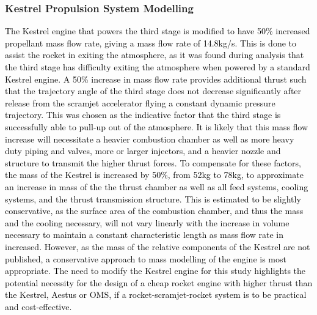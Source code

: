 		\subsubsection{Kestrel Propulsion System Modelling}
			\textcolor{black}{
		The Kestrel engine that powers the third stage is modified to have 50\% increased propellant mass flow rate, giving a mass flow rate of 14.8kg/s. This is done to assist the rocket in exiting the atmosphere, as it was found during analysis that the third stage has difficulty exiting the atmosphere when powered by a standard Kestrel engine. A 50\% increase in mass flow rate provides additional thrust such that the trajectory angle of the third stage does not decrease significantly after release from the scramjet accelerator flying a constant dynamic pressure trajectory. This was chosen as the indicative factor that the third stage is successfully able to pull-up out of the atmosphere. It is likely that this mass flow increase will necessitate a heavier combustion chamber as well as more heavy duty piping and valves, more or larger injectors, and a heavier nozzle and structure to transmit the higher thrust forces\cite{RPE,Huzel1967}. To compensate for these factors, the mass of the Kestrel is increased by 50\%, from 52kg\cite{Wade2017} to 78kg, to approximate an increase in mass of the the thrust chamber as well as all feed systems, cooling systems, and the thrust transmission structure. This is estimated to be slightly conservative, as the surface area of the combustion chamber, and thus the mass and the cooling necessary, will not vary linearly with the increase in volume necessary to maintain a constant characteristic length as mass flow rate in increased\cite{RPE,Huzel1967}. However, as the mass of the relative components of the Kestrel are not published, a conservative approach to mass modelling of the engine is most appropriate. The need to modify the Kestrel engine for this study highlights the potential necessity for the design of a cheap rocket engine with higher thrust than the Kestrel, Aestus or OMS, if a rocket-scramjet-rocket system is to be practical and cost-effective.}
		
